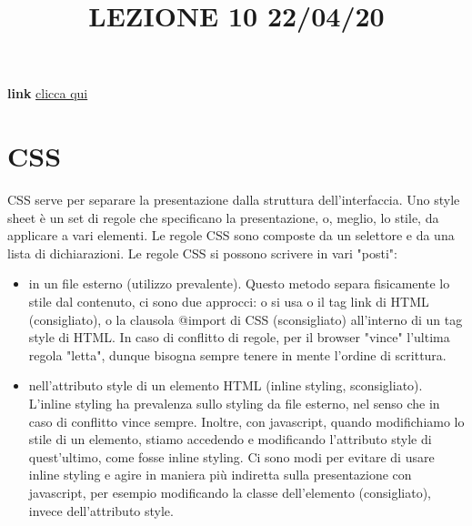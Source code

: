 \title{LEZIONE 10 22/04/20}
\textbf{link} \href{https://web.microsoftstream.com/video/fe590834-dff5-4e57-a227-cb5e10913adc?list=user&userId=cfe0965d-9a7c-40e2-be6e-f078296a1914}{clicca qui}
\section{CSS}
CSS serve per separare la presentazione dalla struttura dell'interfaccia.\newline
\newline
Uno style sheet è un set di regole che specificano la presentazione, o, meglio, lo stile, da applicare a vari elementi. Le regole CSS sono composte da un selettore e da una lista di dichiarazioni.\newline
\newline
Le regole CSS si possono scrivere in vari "posti":
\begin{itemize}
    \item in un file esterno (utilizzo prevalente). Questo metodo separa fisicamente lo stile dal contenuto, ci sono due approcci: o si usa o il tag link di HTML (consigliato), o la clausola @import di CSS (sconsigliato) all'interno di un tag style di HTML. In caso di conflitto di regole, per il browser "vince" l'ultima regola "letta", dunque bisogna sempre tenere in mente l'ordine di scrittura.
    \item nell'attributo style di un elemento HTML (inline styling, sconsigliato). L'inline styling ha prevalenza sullo styling da file esterno, nel senso che in caso di conflitto vince sempre. Inoltre, con javascript, quando modifichiamo lo stile di un elemento, stiamo accedendo e modificando l'attributo style di quest'ultimo, come fosse inline styling. Ci sono modi per evitare di usare inline styling e agire in maniera più indiretta sulla presentazione con javascript, per esempio modificando la classe dell'elemento (consigliato), invece dell'attributo style.
\end{itemize}

